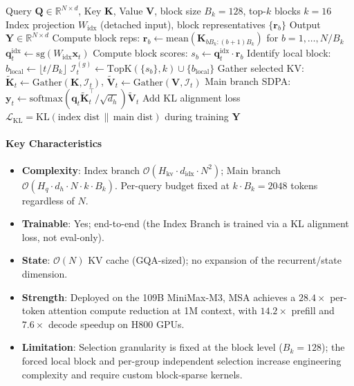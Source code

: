 \begin{algorithm}[H]
\caption{MSA: MiniMax Sparse Attention with Index + Main Branches}
\begin{algorithmic}[1]
\Require Query $\mathbf{Q} \in \mathbb{R}^{N \times d}$, Key $\mathbf{K}$, Value $\mathbf{V}$, block size $B_k = 128$, top-$k$ blocks $k = 16$
\Require Index projection $W_{\text{idx}}$ (detached input), block representatives $\{\mathbf{r}_b\}$
\Ensure Output $\mathbf{Y} \in \mathbb{R}^{N \times d}$
\State Compute block reps: $\mathbf{r}_b \gets \mathrm{mean}(\mathbf{K}_{bB_k:(b+1)B_k})$ for $b = 1, \ldots, N/B_k$
        \State $\mathbf{q}_t^{\text{idx}} \gets \mathrm{sg}(W_{\text{idx}} \mathbf{x}_t)$ 
        \State Compute block scores: $s_b \gets \mathbf{q}_t^{\text{idx}} \cdot \mathbf{r}_b$
        \State Identify local block: $b_{\text{local}} \gets \lfloor t / B_k \rfloor$
        \State $\mathcal{I}_t^{(g)} \gets \mathrm{TopK}(\{s_b\}, k) \cup \{b_{\text{local}}\}$ 
    \EndFor
    \State Gather selected KV: $\tilde{\mathbf{K}}_t \gets \mathrm{Gather}(\mathbf{K}, \mathcal{I}_t)$, $\tilde{\mathbf{V}}_t \gets \mathrm{Gather}(\mathbf{V}, \mathcal{I}_t)$
    \State Main branch SDPA: $\mathbf{y}_t \gets \mathrm{softmax}(\mathbf{q}_t \tilde{\mathbf{K}}_t^\top / \sqrt{d_h}) \tilde{\mathbf{V}}_t$
\EndFor
\State Add KL alignment loss $\mathcal{L}_{\text{KL}} = \mathrm{KL}(\text{index dist} \,\|\, \text{main dist})$ during training
\Return $\mathbf{Y}$
\end{algorithmic}
\end{algorithm}

\paragraph{Key Characteristics}

\begin{itemize}[leftmargin=*]
    \item \textbf{Complexity}: Index branch $\mathcal{O}(H_{\text{kv}} \cdot d_{\text{idx}} \cdot N^2)$; Main branch $\mathcal{O}(H_q \cdot d_h \cdot N \cdot k \cdot B_k)$. Per-query budget fixed at $k \cdot B_k = 2048$ tokens regardless of $N$.
    \item \textbf{Trainable}: Yes; end-to-end (the Index Branch is trained via a KL alignment loss, not eval-only).
    \item \textbf{State}: $\mathcal{O}(N)$ KV cache (GQA-sized); no expansion of the recurrent/state dimension.
    \item \textbf{Strength}: Deployed on the 109B MiniMax-M3, MSA achieves a $28.4\times$ per-token attention compute reduction at 1M context, with $14.2\times$ prefill and $7.6\times$ decode speedup on H800 GPUs.
    \item \textbf{Limitation}: Selection granularity is fixed at the block level ($B_k = 128$); the forced local block and per-group independent selection increase engineering complexity and require custom block-sparse kernels.
\end{itemize}

